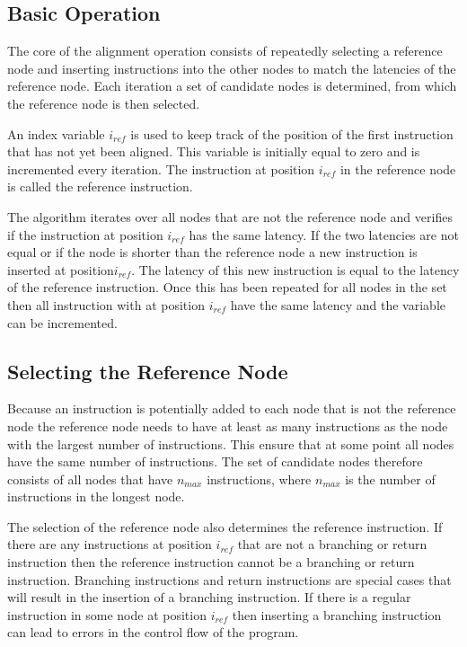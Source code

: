 \subsection{Basic Operation}
The core of the alignment operation consists of repeatedly selecting a reference node and inserting instructions into the other nodes to match the latencies of the reference node. 
Each iteration a set of candidate nodes is determined, from which the reference node is then selected. 

An index variable $i_{ref}$ is used to keep track of the position of the first instruction that has not yet been aligned. This variable is initially equal to zero and is incremented every iteration. 
The instruction at position $i_{ref}$ in the reference node is called the reference instruction.

The algorithm iterates over all nodes that are not the reference node and verifies if the instruction at position $i_{ref}$ has the same latency. 
If the two latencies are not equal or if the node is shorter than the reference node a new instruction is inserted at position$i_{ref}$. 
The latency of this new instruction is equal to the latency of the reference instruction. 
Once this has been repeated for all nodes in the set then all instruction with at position $i_{ref}$ have the same latency and the variable can be incremented. 

\subsection{Selecting the Reference Node}
Because an instruction is potentially added to each node that is not the reference node the reference node needs to have at least as many instructions as the node with the largest number of instructions. 
This ensure that at some point all nodes have the same number of instructions. 
The set of candidate nodes therefore consists of all nodes that have $n_{max}$ instructions, where $n_{max}$ is the number of instructions in the longest node. 

The selection of the reference node also determines the reference instruction. 
If there are any instructions at position $i_{ref}$ that are not a branching or return instruction then the reference instruction cannot be a branching or return instruction. 
Branching instructions and return instructions are special cases that will result in the insertion of a branching instruction. 
If there is a regular instruction in some node at position $i_{ref}$ then inserting a branching instruction can lead to errors in the control flow of the program. 

